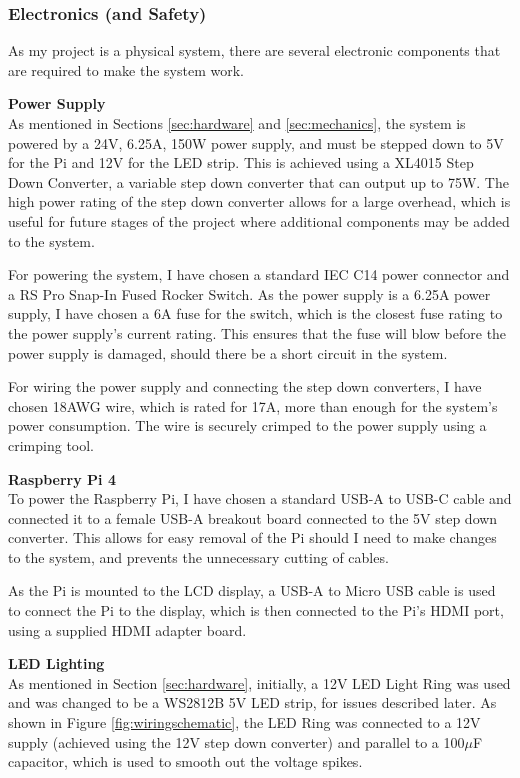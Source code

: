 \subsubsection{Electronics (and Safety)}
As my project is a physical system, there are several electronic components that are required to make the system work.

\noindent
\textbf{Power Supply} \\
As mentioned in Sections \ref*{sec:hardware} and \ref*{sec:mechanics}, the system is powered by a 24V, 6.25A, 150W power supply, and must
be stepped down to 5V for the Pi and 12V for the LED strip. This is achieved using a XL4015 Step Down Converter\cite{xl4015}, a variable
step down converter that can output up to 75W.
The high power rating of the step down converter allows for a large overhead, which is useful for future stages of the project where 
additional components may be added to the system.

For powering the system, I have chosen a standard IEC C14 power connector and a RS Pro Snap-In Fused Rocker Switch\cite{rsproc14switch}.
As the power supply is a 6.25A power supply, I have chosen a 6A fuse for the switch, which is the closest fuse rating to the power supply's
current rating. This ensures that the fuse will blow before the power supply is damaged, should there be a short circuit in the system.

For wiring the power supply and connecting the step down converters, I have chosen 18AWG wire, which is rated for 17A\cite{18awgwire}, 
more than enough for the system's power consumption. The wire is securely crimped to the power supply using a crimping tool.

\noindent
\textbf{Raspberry Pi 4} \\
To power the Raspberry Pi, I have chosen a standard USB-A to USB-C cable and connected it to a female USB-A breakout board connected to the
5V step down converter. This allows for easy removal of the Pi should I need to make changes to the system, and prevents the unnecessary
cutting of cables.

As the Pi is mounted to the LCD display, a USB-A to Micro USB cable is used to connect the Pi to the display, which is then connected to the
Pi's HDMI port, using a supplied HDMI adapter board.

\noindent
\textbf{LED Lighting} \\
As mentioned in Section \ref*{sec:hardware}, initially, a 12V LED Light Ring was used and was changed to be a WS2812B 5V LED strip, for issues described 
later. As shown in Figure \ref*{fig:wiringschematic}, the LED Ring was connected to a 12V supply (achieved using the 12V step down converter) and
parallel to a 100$\mu$F capacitor, which is used to smooth out the voltage spikes.

